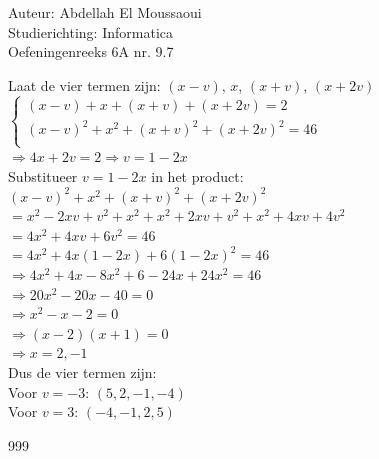 \documentclass[a4paper]{article}
\begin{document}
  
\noindent \large Auteur: Abdellah El Moussaoui \\
\noindent \large Studierichting: Informatica\\
\noindent \large Oefeningenreeks 6A nr. 9.7\\

\medskip

\normalsize

Laat de vier termen zijn: $(x - v)$, $x$, $(x + v)$, $(x + 2v)$\\

$\left\{
\begin{array}{l}
(x-v)+x+(x+v)+(x+2v) = 2\\
(x-v)^2 +  x^2 + (x+v)^2 + (x+2v)^2 = 46\\
\end{array}
\right.$\\

$\Rightarrow 4x+2v = 2 \Rightarrow v=1-2x$\\

Substitueer $v=1-2x$ in het product:\\

$(x-v)^2 + x^2 + (x+v)^2 + (x+2v)^2$\\

$= x^2-2xv+v^2+x^2+x^2+2xv+v^2+x^2+4xv+4v^2$\\

$= 4x^2+4xv+6v^2 = 46$\\

$= 4x^2+4x(1-2x)+6(1-2x)^2 = 46$\\

$\Rightarrow 4x^2+4x-8x^2+6-24x+24x^2=46$\\

$\Rightarrow 20x^2-20x-40=0$\\

$\Rightarrow x^2-x-2=0$\\

$\Rightarrow (x-2)(x+1)=0$\\

$\Rightarrow x=2,-1$\\

Dus de vier termen zijn:\\

Voor $v = -3$: $(5,2,-1,-4)$\\

Voor $v = 3$: $(-4,-1,2,5)$\\

\begin{thebibliography}{999}
\end{thebibliography}
\end{document}
